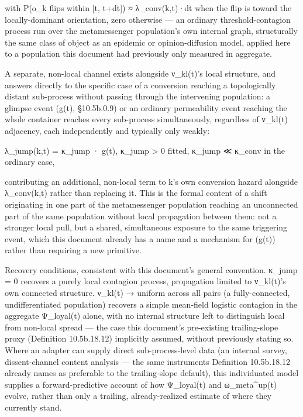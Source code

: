 \documentclass[
]{article}
\begin{document}
with P(o\_k flips within {[}t, t+dt{]}) ≈ λ\_conv(k,t)·dt when the flip
is toward the locally-dominant orientation, zero otherwise --- an
ordinary threshold-contagion process run over the metamessenger
population's own internal graph, structurally the same class of object
as an epidemic or opinion-diffusion model, applied here to a population
this document had previously only measured in aggregate.

A separate, non-local channel exists alongside ν\_kl(t)'s local
structure, and answers directly to the specific case of a conversion
reaching a topologically distant sub-process without passing through the
intervening population: a glimpse event (g(t), §10.5b.0.9) or an
ordinary permeability event reaching the whole container reaches every
sub-process simultaneously, regardless of ν\_kl(t) adjacency, each
independently and typically only weakly:

λ\_jump(k,t) = κ\_jump · g(t), κ\_jump \textgreater{} 0 fitted, κ\_jump
≪ κ\_conv in the ordinary case,

contributing an additional, non-local term to k's own conversion hazard
alongside λ\_conv(k,t) rather than replacing it. This is the formal
content of a shift originating in one part of the metamessenger
population reaching an unconnected part of the same population without
local propagation between them: not a stronger local pull, but a shared,
simultaneous exposure to the same triggering event, which this document
already has a name and a mechanism for (g(t)) rather than requiring a
new primitive.

Recovery conditions, consistent with this document's general convention.
κ\_jump = 0 recovers a purely local contagion process, propagation
limited to ν\_kl(t)'s own connected structure. ν\_kl(t) → uniform across
all pairs (a fully-connected, undifferentiated population) recovers a
simple mean-field logistic contagion in the aggregate Ψ\_loyal(t) alone,
with no internal structure left to distinguish local from non-local
spread --- the case this document's pre-existing trailing-slope proxy
(Definition 10.5b.18.12) implicitly assumed, without previously stating
so. Where an adapter can supply direct sub-process-level data (an
internal survey, dissent-channel content analysis --- the same
instruments Definition 10.5b.18.12 already names as preferable to the
trailing-slope default), this individuated model supplies a
forward-predictive account of how Ψ\_loyal(t) and ω\_meta\^{}up(t)
evolve, rather than only a trailing, already-realized estimate of where
they currently stand.
\end{document}
